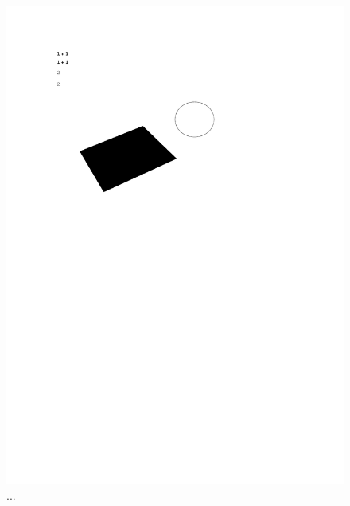 \documentclass[../Paper.tex]{subfiles}
\begin{document}
\begin{figure}[H]
 \centering
 \includegraphics[scale=0.3]{../Figures/1.pdf}
 \caption{...}
\end{figure}
\end{document}

